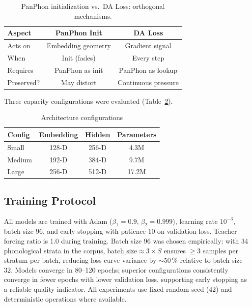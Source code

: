 \documentclass[conference]{IEEEtran}
\begin{document}
\begin{table}[t]
  \caption{PanPhon initialization vs.\ DA Loss: orthogonal mechanisms.}
  \label{tab:orthogonality}
  \centering\small
  \begin{tabular}{lcc}
    \toprule
    Aspect & PanPhon Init & DA Loss \\
    \midrule
    Acts on     & Embedding geometry & Gradient signal \\
    When        & Init (fades)       & Every step \\
    Requires    & PanPhon as init    & PanPhon as lookup \\
    Preserved?  & May distort        & Continuous pressure \\
    \bottomrule
  \end{tabular}
\end{table}

Three capacity configurations were evaluated
(Table~\ref{tab:configs}).

\begin{table}[t]
  \caption{Architecture configurations}
  \label{tab:configs}
  \centering\small
  \begin{tabular}{lccc}
    \toprule
    Config  & Embedding & Hidden & Parameters \\
    \midrule
    Small   & 128-D & 256-D & 4.3M \\
    Medium  & 192-D & 384-D & 9.7M \\
    Large   & 256-D & 512-D & 17.2M \\
    \bottomrule
  \end{tabular}
\end{table}

\subsection{Training Protocol}

All models are trained with Adam ($\beta_1\!=\!0.9$,
$\beta_2\!=\!0.999$), learning rate $10^{-3}$, batch size 96,
and early stopping with patience 10 on validation loss.
Teacher forcing ratio is 1.0 during training.
Batch size 96 was chosen empirically: with 34 phonological strata
in the corpus, $\text{batch\_size} \approx 3 \times S$ ensures
$\geq$3 samples per stratum per batch, reducing loss curve
variance by $\sim$50\,\% relative to batch size 32.
Models converge in 80--120 epochs; superior configurations
consistently converge in fewer epochs with lower validation loss,
supporting early stopping as a reliable quality indicator.
All experiments use fixed random seed (42) and deterministic
operations where available.
\end{document}
